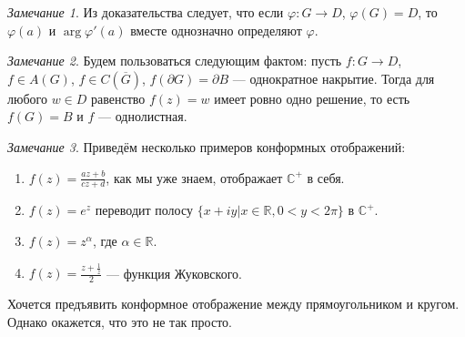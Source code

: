 \documentclass[12pt]{article}
\newcommand{\R}{\mathbb{R}}
\renewcommand{\C}{\mathbb{C}}
\theoremstyle{thmnote}
\theoremstyle{remark}
\newtheorem*{remark}{Замечание}
\theoremstyle{defnote}
\begin{document}
\begin{remark}
    Из доказательства следует, что если $\varphi:G \to D$, $\varphi(G) = D$, то $\varphi(a)$ и $\arg \varphi'(a)$ вместе однозначно определяют $\varphi$.
\end{remark}

\begin{remark}
    Будем пользоваться следующим фактом: пусть $f:G \to D$, $f \in A(G)$, $f \in C(\overline{G})$, $f(\partial G) = \partial B$ --- однократное накрытие. Тогда для любого $w \in D$ равенство $f(z) = w$ имеет ровно одно решение, то есть $f(G) = B$ и $f$ --- однолистная.
\end{remark}

\begin{remark}
    Приведём несколько примеров конформных отображений:
    \begin{enumerate}
        \item $f(z) = \frac{az + b}{cz + d}$, как мы уже знаем, отображает $\C^+$ в себя.
        \item $f(z) = e^z$ переводит полосу $\{x + iy | x \in \R, 0 < y < 2\pi\}$ в $\C^+$.
        \item $f(z) = z^\alpha$, где $\alpha \in \R$.
        \item $f(z) = \frac{z + \frac{1}{z}}{2}$ --- функция Жуковского.
    \end{enumerate}

    Хочется предъявить конформное отображение между прямоугольником и кругом. Однако окажется, что это не так просто.
\end{remark}
\end{document}
